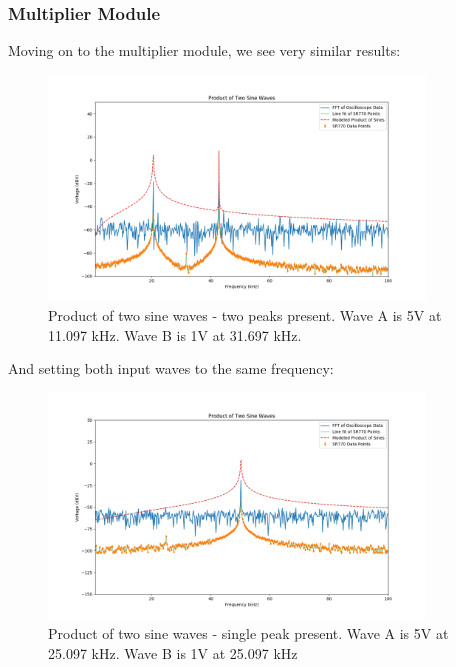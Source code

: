 \documentclass{article}
\begin{document}
\subsubsection{Multiplier Module}%
Moving on to the multiplier module, we see very similar results:

\begin{figure}[H]
    \centering
\begin{minipage}{11cm}
\begin{tcolorbox}
    \centering
        \includegraphics[width=10cm, height=6cm]{figures/figure14.png}
        \caption{Product of two sine waves - two peaks present. Wave A is 5V at
        11.097 kHz. Wave B is 1V at 31.697 kHz.}
        \label{fig:fig14}
\end{tcolorbox}
\end{minipage}
\end{figure}

And setting both input waves to the same frequency:

\begin{figure}[H]
    \centering
\begin{minipage}{11cm}
\begin{tcolorbox}
    \centering
        \includegraphics[width=10cm, height=6cm]{figures/figure15.png}
        \caption{Product of two sine waves - single peak present. Wave A is 5V
        at 25.097 kHz. Wave B is 1V at 25.097 kHz}
        \label{fig:fig15}
\end{tcolorbox}
\end{minipage}
\end{figure}
\end{document}
